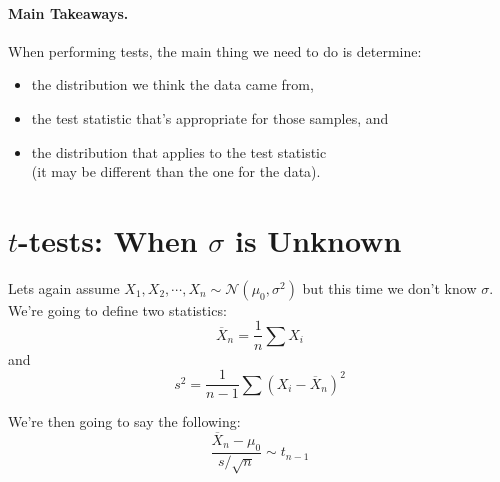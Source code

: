 \paragraph{Main Takeaways.}
When performing tests, the main thing we need to do is determine: 
\begin{itemize}
\item the distribution we think the data came from, 
\item the test statistic that's appropriate for those samples, and 
\item the distribution that applies to the test statistic\\ (it may be different than the one for the data). 
\end{itemize}

\section{$t$-tests: When $\sigma$ is Unknown}
Lets again assume $X_1,X_2,\cdots,X_n\sim\mathcal{N}(\mu_0,\sigma^2)$ but this time we don't know $\sigma$. 
We're going to define two statistics: 
\[\overline{X}_n = \frac{1}{n}\sum X_i\]
and
\[s^2 = \frac{1}{n-1}\sum(X_i-\overline{X}_n)^2\]

We're then going to say the following:
\[\frac{\overline{X}_n-\mu_0}{s/\sqrt{n}}\sim t_{n-1}\]


